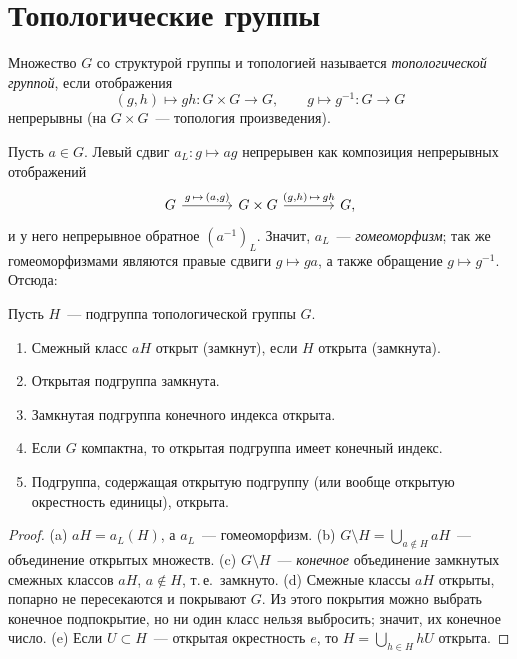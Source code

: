 \section{Топологические группы}

\begin{definition}[7.1]
Множество $G$ со структурой группы и топологией называется \emph{топологической группой}, если отображения
\[
(g,h)\mapsto gh\colon G\times G\to G,\qquad g\mapsto g^{-1}\colon G\to G
\]
непрерывны (на $G\times G$~--- топология произведения).
\end{definition}

Пусть $a\in G$. Левый сдвиг $a_L\colon g\mapsto ag$ непрерывен как композиция непрерывных отображений
\[
\begin{tikzcd}[column sep=large]
G\arrow[r,"{g\,\mapsto\,(a,g)}"] & G\times G\arrow[r,"{(g,h)\,\mapsto\,gh}"] & G,
\end{tikzcd}
\]
и у него непрерывное обратное $(a^{-1})_L$. Значит, $a_L$~--- \emph{гомеоморфизм}; так же
гомеоморфизмами являются правые сдвиги $g\mapsto ga$, а также обращение $g\mapsto g^{-1}$. Отсюда:

\begin{lemma}[7.1a]
Пусть $H$~--- подгруппа топологической группы $G$.
\begin{enumerate}[label=\textup{(\alph*)}]
\item Смежный класс $aH$ открыт (замкнут), если $H$ открыта (замкнута).
\item Открытая подгруппа замкнута.
\item Замкнутая подгруппа конечного индекса открыта.
\item Если $G$ компактна, то открытая подгруппа имеет конечный индекс.
\item Подгруппа, содержащая открытую подгруппу (или вообще открытую окрестность единицы), открыта.
\end{enumerate}
\end{lemma}

\begin{proof}
(a) $aH=a_L(H)$, а $a_L$~--- гомеоморфизм.
(b) $G\setminus H=\bigcup_{a\notin H}aH$~--- объединение открытых множеств.
(c) $G\setminus H$~--- \emph{конечное} объединение замкнутых смежных классов $aH$, $a\notin H$, т.\,е.\ замкнуто.
(d) Смежные классы $aH$ открыты, попарно не пересекаются и покрывают $G$. Из этого покрытия можно выбрать конечное
подпокрытие, но ни один класс нельзя выбросить; значит, их конечное число.
(e) Если $U\subset H$~--- открытая окрестность $e$, то $H=\bigcup_{h\in H}hU$ открыта.
\end{proof}

